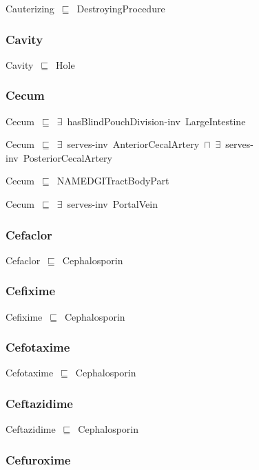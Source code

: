 \documentclass{article}
\begin{document}
Cauterizing~\ensuremath{\sqsubseteq}~DestroyingProcedure~

\subsubsection*{Cavity}

Cavity~\ensuremath{\sqsubseteq}~Hole~

\subsubsection*{Cecum}

Cecum~\ensuremath{\sqsubseteq}~\ensuremath{\exists}~hasBlindPouchDivision-inv~LargeIntestine~

Cecum~\ensuremath{\sqsubseteq}~\ensuremath{\exists}~serves-inv~AnteriorCecalArtery~\ensuremath{\sqcap}~\ensuremath{\exists}~serves-inv~PosteriorCecalArtery~

Cecum~\ensuremath{\sqsubseteq}~NAMEDGITractBodyPart~

Cecum~\ensuremath{\sqsubseteq}~\ensuremath{\exists}~serves-inv~PortalVein~

\subsubsection*{Cefaclor}

Cefaclor~\ensuremath{\sqsubseteq}~Cephalosporin~

\subsubsection*{Cefixime}

Cefixime~\ensuremath{\sqsubseteq}~Cephalosporin~

\subsubsection*{Cefotaxime}

Cefotaxime~\ensuremath{\sqsubseteq}~Cephalosporin~

\subsubsection*{Ceftazidime}

Ceftazidime~\ensuremath{\sqsubseteq}~Cephalosporin~

\subsubsection*{Cefuroxime}
\end{document}
